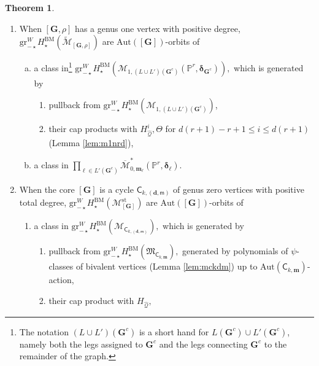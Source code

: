 \documentclass[12pt,reqno]{amsart}
\theoremstyle{definition}
\theoremstyle{definition}
\theoremstyle{definition}
\theoremstyle{definition}
\newtheorem{theorem}{Theorem}[section]
\newcommand{\ol}[1]{\overline{#1}}
\newcommand{\Mcal}{\mathcal{M}}
\newcommand{\Mbar}{\ol{\Mcal}}
\newcommand{\Mtil}{\widetilde{\mathcal{M}}}
\newcommand{\gr}{\mathrm{gr}}
\begin{document}
\begin{theorem}\label{thm:gens}
  \begin{enumerate}
    \item When $[\mathbf{G},\rho]$ has a genus one vertex with positive degree, $\gr^{W}_{-\star}H_\star^{\mathrm{BM}}(\Mtil_{[\mathbf{G},\rho]})$ are $\mathrm{Aut}([\mathbf{G}])$-orbits of
    \begin{enumerate}[(a)]
      \item a class in\footnote{The notation $(L\cup L')(\mathbf{G}^c)$ is a short hand for $L(\mathbf{G}^c)\cup L'(\mathbf{G}^c)$, namely both the legs assigned to $\mathbf{G}^c$ and the legs connecting $\mathbf{G}^c$ to the remainder of the graph.} $\gr^{W}_{-\star}H_\star^{\mathrm{BM}}(\mathcal{M}_{1,(L\cup L')(\mathbf{G}^c)}(\mathbb{P}^r,\boldsymbol{\delta}_{\mathbf{G}^c})),$ which is generated by 
      \begin{enumerate}
        \item pullback from $\gr^{W}_{-\star}H_\star^{\mathrm{BM}}(\mathcal{M}_{1,(L\cup L')(\mathbf{G}^c)})$,
        \item their cap products  with $H_{\hat{\mathcal{Q}}}^i, \Theta$ for $d(r + 1) - r + 1 \leq  i \leq d(r + 1)$ (Lemma \ref{lem:m1nrd}), 
      \end{enumerate} 
      \item a class in $\prod_{\ell\in L'(\mathbf{G}^c)}\Mbar^*_{0, \boldsymbol{m}_{\ell}}(\mathbb{P}^r, \boldsymbol{\delta}_{\ell}).$
    \end{enumerate}
    \item When the core $[\mathbf{G}]$ is a cycle $\mathsf{C}_{k, (\mathbf{d}, \mathsf{m})}$ of genus zero vertices with positive total degree, $\gr^W_{-\star} H^{\mathrm{BM}}_\star(\mathcal{M}^{\mathrm{st}}_{[\mathbf{G}]})$ are $\mathrm{Aut}([\mathbf{G}])$-orbits of
    \begin{enumerate}
      \item a class in $\gr^{W}_{-\star}H_\star^{\mathrm{BM}}(\mathcal{M}_{\mathsf{C}_{k, (\mathbf{d}, \mathsf{m})}}),$ which is generated by \begin{enumerate}
        \item pullback from $\gr^{W}_{-\star}H_\star^{\mathrm{BM}}(\mathfrak{M}_{\mathsf{C}_{k, \mathbf{m}}}),$ generated by polynomials of $\psi$-classes of bivalent vertices (Lemma \ref{lem:mckdm}) up to $\mathrm{Aut}(\mathsf{C}_{k, \mathbf{m}})$-action, 
        \item their cap product with $H_{\hat{\mathcal{Q}}},$
      \end{enumerate}

\end{enumerate}
\end{enumerate}
\end{theorem}
\end{document}

